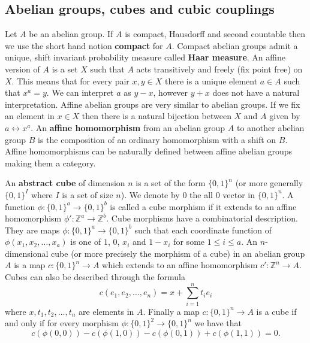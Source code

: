 \documentclass [11pt] {article}
\begin{document}


\subsection{Abelian groups, cubes and cubic couplings}\label{cubes}

Let $A$ be an abelian group. If $A$ is compact, Hausdorff and second countable then we use the short hand notion {\bf compact} for $A$. Compact abelian groups admit a unique, shift invariant probability measure called {\bf Haar measure}.
An affine version of $A$ is a set $X$ such that $A$ acts transitively and freely (fix point free) on $X$. This means that for every pair $x,y\in X$ there is a unique element $a\in A$ such that $x^a=y$. We can interpret $a$ as $y-x$, however $y+x$ does not have a natural interpretation. Affine abelian groups are very similar to abelian groups. If we fix an element in $x\in X$ then there is a natural bijection between $X$ and $A$ given by $a\longleftrightarrow x^a$. An {\bf affine homomorphism} from an abelian group $A$ to another abelian group $B$ is the composition of an ordinary homomorphism with a shift on $B$. Affine homomorphisms can be naturally defined between affine abelian groups making them a category. 

\medskip

An {\bf abstract cube} of dimension $n$ is a set of the form $\{0,1\}^n$ (or more generally $\{0,1\}^I$ where $I$ is a set of size $n$). We denote by $0$ the all $0$ vector in $\{0,1\}^n$. A function $\phi:\{0,1\}^a\rightarrow\{0,1\}^b$ is called a cube morphism if it extends to an affine homomorphism $\phi':\mathbb{Z}^a\rightarrow\mathbb{Z}^b$. 
Cube morphisms have a combinatorial description. They are maps $\phi:\{0,1\}^a\rightarrow\{0,1\}^b$ such that each coordinate function of $\phi(x_1,x_2,\dots,x_a)$ is one of $1$, $0$, $x_i$ and $1-x_i$ for some $1\leq i\leq a$. 
An $n$-dimensional cube (or more precisely the morphism of a cube) in an abelian group $A$ is a map $c:\{0,1\}^n\rightarrow A$ which extends to an affine homomorphism $c':\mathbb{Z}^n\rightarrow A$.
Cubes can also be described through the formula
$$c(e_1,e_2,\dots,e_n)=x+\sum_{i=1}^n t_ie_i$$
where $x,t_1,t_2,\dots,t_n$ are elements in $A$. Finally 
a map $c:\{0,1\}^n\rightarrow A$ is a cube if and only if for every morphism $\phi:\{0,1\}^2\rightarrow\{0,1\}^n$ we have that $$c(\phi(0,0))-c(\phi(1,0))-c(\phi(0,1))+c(\phi(1,1))=0.$$
\end{document}
